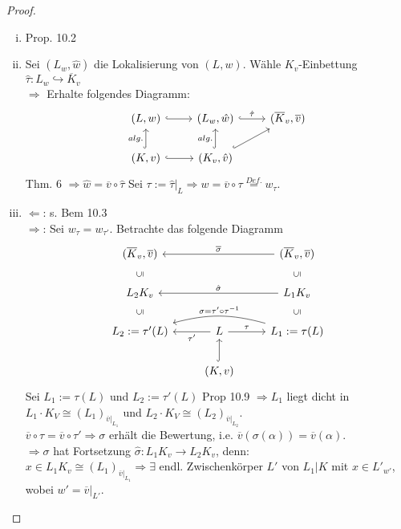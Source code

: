 \begin{proof}
\begin{enumerate}[i)]
\item Prop. 10.2
\item Sei $(L_w, \hat{w})$ die Lokalisierung von $(L,w)$. Wähle $K_v$-Einbettung $\hat{\tau}: L_w \hookrightarrow \overline{K}_v$\\
$\Rightarrow$ Erhalte folgendes Diagramm:
\[\begin{tikzcd}
(L,w) \arrow[r, hook] & (L_w, \hat{w}) \arrow[r, hook, "\hat{\tau}"] & (\overline{K}_v, \overline{v})\\
(K,v) \arrow[u, hook, "alg."] \arrow[r, hook] &(K_v, \hat{v}) \arrow[u, hook, "alg."] \arrow[ru, hook]
\end{tikzcd}\]
Thm. 6 $\Rightarrow \hat{w}= \overline{v} \circ \hat{\tau}$ Sei $\tau := \hat{\tau}|_L \Rightarrow w = \overline{v} \circ \tau \stackrel{Def.}{=} w_\tau$.
\item \glqq $\Leftarrow$\grqq : s. Bem 10.3\\
\glqq $\Rightarrow$\grqq : Sei $w_\tau = w_{\tau'}$. Betrachte das folgende Diagramm
\[
\begin{tikzcd}
(\overline{K}_v, \overline{v}) && (\overline{K}_v, \overline{v}) \arrow[ll,swap, "\overline{\sigma}"]\\
L_2 K_v \arrow[draw=none]{u}[auto=false, sloped]{\subseteq} && L_1 K_v \arrow[draw=none]{u}[auto=false, sloped]{\subseteq} \arrow[ll,swap, "\hat{\sigma}"]\\
L_2:=\tau'(L) \arrow[draw=none]{u}[auto=false, sloped]{\subseteq} & L \arrow[l, "\tau'"]\arrow[r, "\tau"] & L_1:=\tau(L) \arrow[draw=none]{u}[auto=false, sloped]{\subseteq} \arrow[ll, bend right=15, swap, "\sigma=\tau' \circ \tau^{-1}"]\\
&(K,v) \arrow[u, hook]&
\end{tikzcd}
\]
Sei $L_1 := \tau(L)$ und $L_2:=\tau'(L)$ Prop 10.9 $\Rightarrow L_1$ liegt dicht in $L_1 \cdot K_V \cong (L_1)_{\overline{v}|_{L_1}}$ und $L_2 \cdot K_V \cong (L_2)_{\overline{v}|_{L_2}}$.\\
$\overline{v}  \circ \tau = \overline{v} \circ \tau' \Rightarrow \sigma$ erhält die Bewertung, i.e. $\overline{v}(\sigma(\alpha)) = \overline{v}(\alpha)$.\\
$\Rightarrow \sigma$ hat Fortsetzung $\hat{\sigma}: L_1 K_v \to L_2 K_v$, denn:\\
$x \in L_1 K_v \cong (L_1)_{\overline{v}|_{L_1}} \Rightarrow \exists
 $ endl. Zwischenkörper $L'$ von $L_1 |K$ mit $x \in L'_{w'}$, wobei $w'=\overline{v}|_{L'}$.\\

\end{enumerate}
\end{proof}
